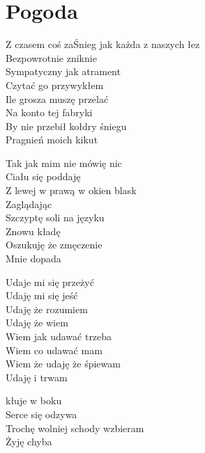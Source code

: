 \section{Pogoda}
\begin{text}
Z czasem coś zaŚnieg jak każda z naszych łez\\
Bezpowrotnie zniknie\\
Sympatyczny jak atrament\\
Czytać go przywykłem\\
Ile grosza muszę przelać\\
Na konto tej fabryki\\
By nie przebił kołdry śniegu\\
Pragnień moich kikut

Tak jak mim nie mówię nic\\
Ciału się poddaję\\
Z lewej w prawą w okien blask\\
Zaglądając\\
Szczyptę soli na języku\\
Znowu kładę\\
Oszukuję że zmęczenie\\
Mnie dopada

Udaje mi się przeżyć\\
Udaję mi się jeść\\
Udaję że rozumiem\\
Udaję że wiem\\
Wiem jak udawać trzeba\\
Wiem co udawać mam\\
Wiem że udaję że śpiewam\\
Udaję i trwam

kłuje w boku\\
Serce się odzywa\\
Trochę wolniej schody wzbieram\\
Żyję chyba
\end{text}